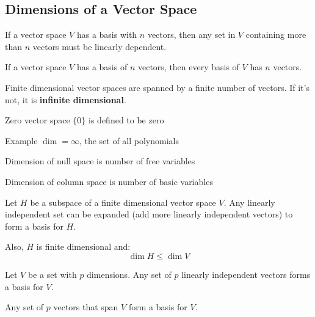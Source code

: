 \begin{card}
    \subsection{Dimensions of a Vector Space}

    \begin{theorem}
    If a vector space $V$ has a basis with $n$ vectors, then any set in
    $V$ containing more than $n$ vectors must be linearly dependent.
    \end{theorem}%

    \begin{theorem}%
        If a vector space $V$ has a basis of $n$ vectors,
        then every basis of $V$ has $n$ vectors.
    \end{theorem}%
    \begin{compactdesc}
    \item[Finite dimensional] vector spaces are spanned by a
        finite number of vectors. If it's not, it is \textbf{infinite dimensional}.
    \item[Zero vector space] $\{0\}$ is defined to be zero
    \item[Example] $\dim = \infty$, the set of all polynomials
    \item[Dimension of null] space is number of free variables
    \item[Dimension of column] space is number of basic variables
    \end{compactdesc}

    \begin{theorem}
    Let $H$ be a subspace of a finite dimensional vector space $V$.
    Any linearly independent set can be expanded (add more linearly independent
    vectors) to form a basis for $H$.

    Also, $H$ is finite dimensional and:
    $$\dim H \leq \dim V$$
    \end{theorem}
    \begin{theorem}
    Let $V$ be a set with $p$ dimensions.
    Any set of $p$ linearly independent vectors forms a basis for $V$.

    Any set of $p$ vectors that span $V$ form a basis for $V$.
    \end{theorem}
\end{card}


